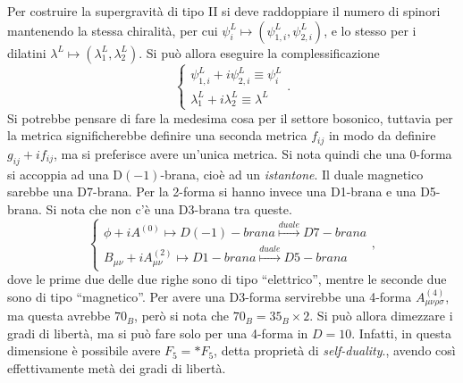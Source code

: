 Per costruire la supergravità di tipo II si deve raddoppiare il numero di spinori mantenendo la stessa chiralità, per cui $\psi_i^L \mapsto (\psi_{1,i}^L,\psi_{2,i}^L)$, e lo stesso per i dilatini $\lambda^L \mapsto (\lambda_1^L,\lambda_2^L)$. Si può allora eseguire la complessificazione 
\begin{equation}
    \begin{cases}
        \psi_{1,i}^L + i\psi_{2,i}^L \equiv \psi_i^L \\
        \lambda^L_1 + i\lambda_2^L \equiv \lambda^L
    \end{cases}.
\end{equation}
Si potrebbe pensare di fare la medesima cosa per il settore bosonico, tuttavia per la metrica significherebbe definire una seconda metrica $f_{ij}$ in modo da definire $g_{ij} + if_{ij}$, ma si preferisce avere un'unica metrica. Si nota quindi che una 0-forma si accoppia ad una D$(-1)$-brana, cioè ad un \emph{istantone}. Il duale magnetico sarebbe una D7-brana. Per la 2-forma si hanno invece una D1-brana e una D5-brana. Si nota che non c'è una D3-brana tra queste. 
\begin{equation}
    \begin{cases}
        \phi + iA^{(0)} \mapsto D(-1)-brana \overset{duale}{\mapsto} D7-brana \\
        B_{\mu\nu} + iA_{\mu\nu}^{(2)} \mapsto D1-brana \overset{duale}{\mapsto} D5-brana
    \end{cases},
\end{equation}
dove le prime due delle due righe sono di tipo ``elettrico'', mentre le seconde due sono di tipo ``magnetico''. Per avere una D3-forma servirebbe una 4-forma $A_{\mu\nu\rho\sigma}^{(4)}$, ma questa avrebbe $70_B$, però si nota che $70_B = 35_B \times 2$. Si può allora dimezzare i gradi di libertà, ma si può fare solo per una 4-forma in $D = 10$. Infatti, in questa dimensione è possibile avere $F_5 = *F_5$, detta proprietà di \emph{self-duality}., avendo così effettivamente metà dei gradi di libertà. 

